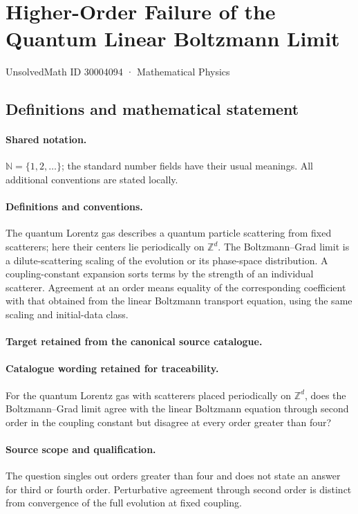 \documentclass[11pt]{article}
\begin{document}
\setcounter{section}{30004093}
\section{Higher-Order Failure of the Quantum Linear Boltzmann Limit}\label{30004094}
{\small UnsolvedMath ID 30004094 · Mathematical Physics}
\subsection{Definitions and mathematical statement}

\paragraph{Shared notation.}$\mathbb N=\{1,2,\ldots\}$; the standard number fields have their usual meanings. All additional conventions are stated locally.


\paragraph{Definitions and conventions.}
The quantum Lorentz gas describes a quantum particle scattering from fixed scatterers; here their centers lie periodically on $\mathbb Z^d$. The Boltzmann--Grad limit is a dilute-scattering scaling of the evolution or its phase-space distribution. A coupling-constant expansion sorts terms by the strength of an individual scatterer. Agreement at an order means equality of the corresponding coefficient with that obtained from the linear Boltzmann transport equation, using the same scaling and initial-data class.

\paragraph{Target retained from the canonical source catalogue.}
\paragraph{Catalogue wording retained for traceability.}
For the quantum Lorentz gas with scatterers placed periodically on $\mathbb Z^d$, does the Boltzmann–Grad limit agree with the linear Boltzmann equation through second order in the coupling constant but disagree at every order greater than four?

\paragraph{Source scope and qualification.}
The question singles out orders greater than four and does not state an answer for third or fourth order. Perturbative agreement through second order is distinct from convergence of the full evolution at fixed coupling.
\end{document}
